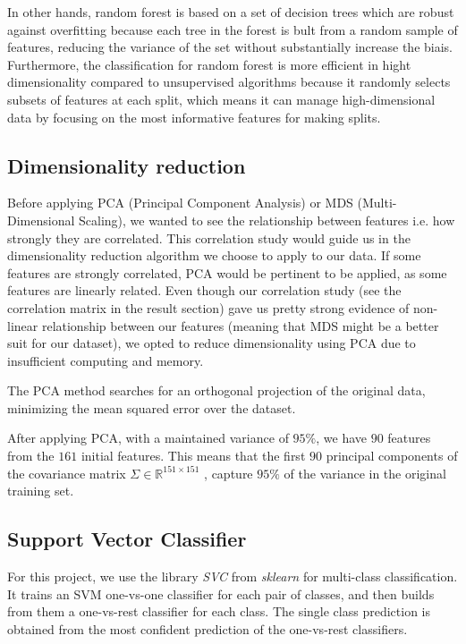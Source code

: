 \documentclass[twocolumn]{article}
\begin{document}
In other hands, random forest is based on a set of decision trees which are robust against overfitting because each tree in the forest is bult from a random sample of features, reducing the variance of the set without substantially increase the biais. Furthermore, the classification for random forest is more efficient in hight dimensionality compared to unsupervised algorithms because it randomly selects subsets of features at each split, which means it can manage high-dimensional data by focusing on the most informative features for making splits.


\subsection{Dimensionality reduction}
Before applying PCA (Principal Component Analysis) or MDS (Multi-Dimensional Scaling), we wanted to see the relationship between features i.e. how strongly they are correlated. This correlation study would guide us in the dimensionality reduction algorithm we choose to apply to our data. If some features are strongly correlated, PCA would be pertinent to be applied, as some features are linearly related. Even though our correlation study (see the correlation matrix in the result section) gave us pretty strong evidence of non-linear relationship between our features (meaning that MDS might be a better suit for our dataset), we opted to reduce dimensionality using PCA due to insufficient computing and memory.

The PCA method searches for an orthogonal projection of the original data, minimizing the mean squared error over the dataset. 

After applying PCA, with a maintained variance of $95\%$, we have $90$ features from the $161$ initial features. This means that the first $90$ principal components of the covariance matrix $\Sigma \in \mathbb{R}^{151 \times 151}$ , capture $95\%$ of the variance in the original training set.

\subsection{Support Vector Classifier}
For this project, we use the library \textit{SVC} from \textit{sklearn} for multi-class classification. It trains an SVM one-vs-one classifier for each pair of classes, and then builds from them a one-vs-rest classifier for each class. The single class prediction is obtained from the most confident prediction of the one-vs-rest classifiers. 
\end{document}
